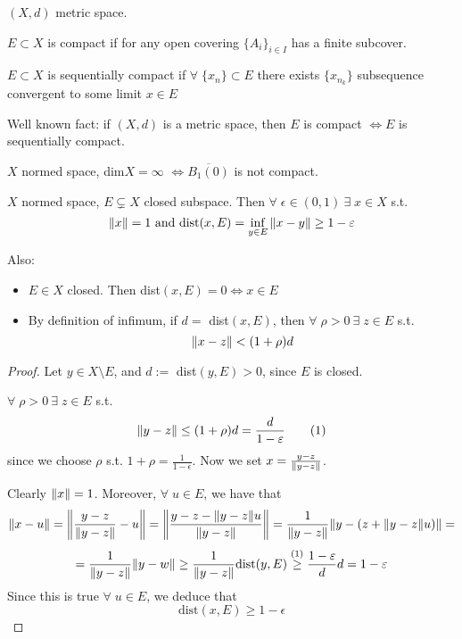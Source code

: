 \(\left(X, d\right)\) metric space.
\begin{definition}
    \(E \subset X\) is compact if for any open covering \(\{A_i\}_{i \in I}\) has a finite subcover.
\end{definition}

\begin{definition}
    \(E \subset X\) is sequentially compact if \(\forall \; \{x_n\} \subset E \) 
    there exists \(\{x_{n_k}\}\) subsequence convergent to some limit \(x \in E\)
\end{definition}

Well known fact: if \(\left(X, d\right)\) is a metric space, then \(E\) is compact \(\Leftrightarrow E \) is sequentially compact.

\begin{theorem}
    \(X\) normed space, dim\(X = \infty\) \(\Leftrightarrow \overline{B_1(0)}\) is not compact. 
\end{theorem}

\begin{lemma}
    \(X\) normed space, \(E \subsetneq X\) closed subspace. Then \(\forall \; \epsilon \in \left(0, 1\right) \ \exists \; x \in X \) s.t. 
    \[
        \norm{x}=1 \text{ and } \text{dist}(x, E) = \inf_{y \in E} \norm{x-y} \geq 1- \varepsilon\]
\end{lemma}

\begin{remark}
    Also:
    \begin{itemize}
        \item \(E \in X\) closed. Then dist\((x, E)=0 \Leftrightarrow x \in E\)
        \item By definition of infimum, if \(d =\) dist\((x, E)\), then \(\forall \; \rho >0 \ \exists \; z \in E\) s.t. 
        \[
            \norm{x-z} < (1+\rho) d
        \]
    \end{itemize}
\end{remark}

\begin{proof}
    Let \(y \in X \setminus E\), and \(d := \) dist\((y, E) >0\), since \(E\) is closed. 
    
    \(\forall \; \rho > 0 \ \exists \; z \in E \) s.t.
    \[
        \norm{y-z} \leq (1+\rho)d = \frac{d}{1-\varepsilon} \tag{1}
    \]
    since we choose \(\rho\) s.t. \(1+\rho = \frac{1}{1-\epsilon}\). Now we set \(x = \frac{y-z}{\norm{y-z}}\).

    Clearly \(\norm{x}=1\). Moreover, \(\forall \; u \in E\), we have that
    \[
        \norm{x-u} = \norm{ \frac{y-z}{\norm{y-z}} - u }
        = \norm{ \frac{y-z -\norm{y-z}u }{\norm{y-z}} }
        = \frac{1}{\norm{y-z}} \norm{y-(z + \norm{y-z}u)} =
    \]
    \[
        = \frac{1}{\norm{y-z}} \norm{y-w}
        \geq \frac{1}{\norm{y-z}} \text{dist}(y, E)
        \overset{(1)}{\geq} \frac{1-\varepsilon}{d} d = 1 - \varepsilon
    \]
    Since this is true \(\forall \; u \in E\), we deduce that
    \[
        \text{dist}(x, E) \geq 1-\epsilon
    \]
\end{proof}



